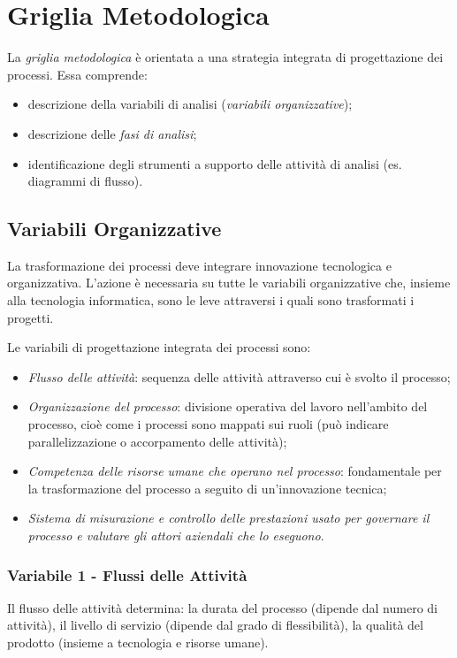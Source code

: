 \documentclass[a4paper, notitlepage, 9pt]{extreport}
\begin{document}
\section*{Griglia Metodologica}
La \textit{griglia metodologica} è orientata a una strategia integrata di progettazione dei processi. Essa comprende:
\begin{itemize}
	\item descrizione della variabili di analisi (\textit{variabili organizzative});
	\item descrizione delle \textit{fasi di analisi};
	\item identificazione degli strumenti a supporto delle attività di analisi (es. diagrammi di flusso).
\end{itemize}

\subsection*{Variabili Organizzative}
La trasformazione dei processi deve integrare innovazione tecnologica e organizzativa. L'azione è necessaria su tutte le variabili organizzative che, insieme alla tecnologia informatica, sono le leve attraversi i quali sono trasformati i progetti.

\noindent
Le variabili di progettazione integrata dei processi sono:
\begin{itemize}
	\item \textit{Flusso delle attività}: sequenza delle attività attraverso cui è svolto il processo;
	\item \textit{Organizzazione del processo}: divisione operativa del lavoro nell’ambito del processo, cioè come i processi sono mappati sui ruoli (può indicare parallelizzazione o accorpamento delle attività);
	\item \textit{Competenza delle risorse umane che operano nel processo}: fondamentale per la trasformazione del processo a seguito di un'innovazione tecnica;
	\item \textit{Sistema di misurazione e controllo delle prestazioni usato per governare il processo e valutare gli attori aziendali che lo eseguono}.
\end{itemize}

\subsubsection*{Variabile 1 - Flussi delle Attività}
Il flusso delle attività determina: la durata del processo (dipende dal numero di attività), il livello di servizio (dipende dal grado di flessibilità), la qualità del prodotto (insieme a tecnologia e risorse umane).
\end{document}

